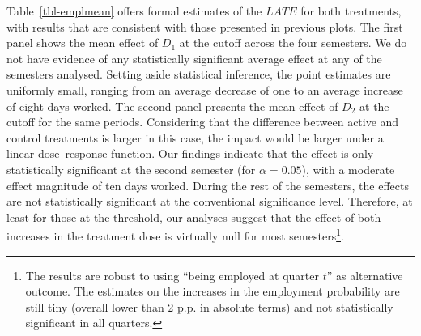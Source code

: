 \documentclass[
  11pt]{article}
\begin{document}
Table~\ref{tbl-emplmean} offers formal estimates of the \(LATE\) for
both treatments, with results that are consistent with those presented
in previous plots. The first panel shows the mean effect of \(D_1\) at
the cutoff across the four semesters. We do not have evidence of any
statistically significant average effect at any of the semesters
analysed. Setting aside statistical inference, the point estimates are
uniformly small, ranging from an average decrease of one to an average
increase of eight days worked. The second panel presents the mean effect
of \(D_2\) at the cutoff for the same periods. Considering that the
difference between active and control treatments is larger in this case,
the impact would be larger under a linear dose--response function. Our
findings indicate that the effect is only statistically significant at
the second semester (for \(\alpha=0.05\)), with a moderate effect
magnitude of ten days worked. During the rest of the semesters, the
effects are not statistically significant at the conventional
significance level. Therefore, at least for those at the threshold, our
analyses suggest that the effect of both increases in the treatment dose
is virtually null for most semesters\footnote{The results are robust to
  using ``being employed at quarter \(t\)'' as alternative outcome. The
  estimates on the increases in the employment probability are still
  tiny (overall lower than 2 p.p. in absolute terms) and not
  statistically significant in all quarters.}.
\end{document}
